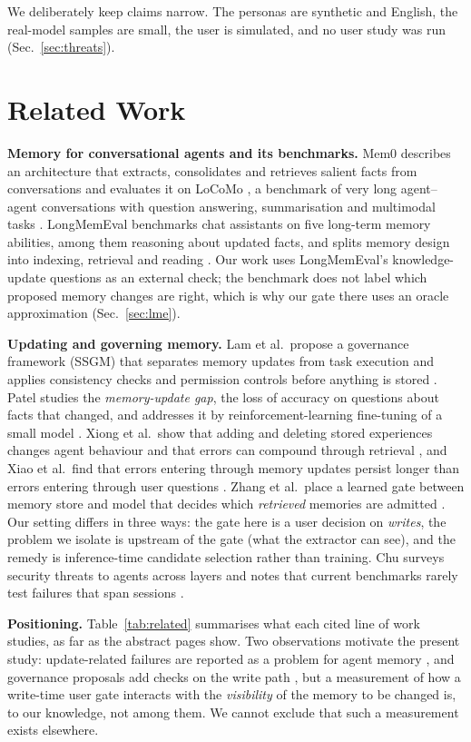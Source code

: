 \IfFileExists{IEEEtran.cls}{\documentclass[journal]{IEEEtran}\def\HAVEIEEE{1}}{\documentclass[10pt,twocolumn]{article}\usepackage[margin=0.7in,columnsep=0.25in]{geometry}}
\begin{document}
We deliberately keep claims narrow. The personas are synthetic and English, the real-model samples are small, the user is simulated, and no user study was run (Sec.~\ref{sec:threats}).

\section{Related Work}
\label{sec:related}
\textbf{Memory for conversational agents and its benchmarks.} Mem0 describes an architecture that extracts, consolidates and retrieves salient facts from conversations and evaluates it on LoCoMo \cite{chhikara2025mem0}, a benchmark of very long agent--agent conversations with question answering, summarisation and multimodal tasks \cite{maharana2024locomo}. LongMemEval benchmarks chat assistants on five long-term memory abilities, among them reasoning about updated facts, and splits memory design into indexing, retrieval and reading \cite{wu2024longmemeval}. Our work uses LongMemEval's knowledge-update questions as an external check; the benchmark does not label which proposed memory changes are right, which is why our gate there uses an oracle approximation (Sec.~\ref{sec:lme}).

\textbf{Updating and governing memory.} Lam et al.\ propose a governance framework (SSGM) that separates memory updates from task execution and applies consistency checks and permission controls before anything is stored \cite{lam2026ssgm}. Patel studies the \emph{memory-update gap}, the loss of accuracy on questions about facts that changed, and addresses it by reinforcement-learning fine-tuning of a small model \cite{patel2026supersede}. Xiong et al.\ show that adding and deleting stored experiences changes agent behaviour and that errors can compound through retrieval \cite{xiong2025memory}, and Xiao et al.\ find that errors entering through memory updates persist longer than errors entering through user questions \cite{xiao2026errors}. Zhang et al.\ place a learned gate between memory store and model that decides which \emph{retrieved} memories are admitted \cite{zhang2026memgate}. Our setting differs in three ways: the gate here is a user decision on \emph{writes}, the problem we isolate is upstream of the gate (what the extractor can see), and the remedy is inference-time candidate selection rather than training. Chu surveys security threats to agents across layers and notes that current benchmarks rarely test failures that span sessions \cite{chu2026survey}.

\textbf{Positioning.} Table~\ref{tab:related} summarises what each cited line of work studies, as far as the abstract pages show. Two observations motivate the present study: update-related failures are reported as a problem for agent memory \cite{patel2026supersede,xiao2026errors}, and governance proposals add checks on the write path \cite{lam2026ssgm}, but a measurement of how a write-time user gate interacts with the \emph{visibility} of the memory to be changed is, to our knowledge, not among them. We cannot exclude that such a measurement exists elsewhere.
\end{document}
